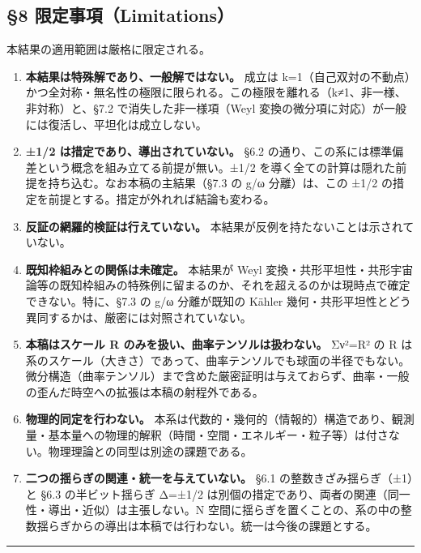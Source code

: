 \documentclass[11pt]{ltjsarticle}
\begin{document}
\subsection{§8
限定事項（Limitations）}\label{ux9650ux5b9aux4e8bux9805limitations}

本結果の適用範囲は厳格に限定される。

\begin{enumerate}
\def\labelenumi{\arabic{enumi}.}
\item
  \textbf{本結果は特殊解であり、一般解ではない。} 成立は
  k=1（自己双対の不動点）かつ全対称・無名性の極限に限られる。この極限を離れる（k≠1、非一様、非対称）と、§7.2
  で消失した非一様項（Weyl
  変換の微分項に対応）が一般には復活し、平坦化は成立しない。
\item
  \textbf{±1/2 は措定であり、導出されていない。} §6.2
  の通り、この系には標準偏差という概念を組み立てる前提が無い。±1/2
  を導く全ての計算は隠れた前提を持ち込む。なお本稿の主結果（§7.3 の g/ω
  分離）は、この ±1/2 の措定を前提とする。措定が外れれば結論も変わる。
\item
  \textbf{反証の網羅的検証は行えていない。}
  本結果が反例を持たないことは示されていない。
\item
  \textbf{既知枠組みとの関係は未確定。} 本結果が Weyl
  変換・共形平坦性・共形宇宙論等の既知枠組みの特殊例に留まるのか、それを超えるのかは現時点で確定できない。特に、§7.3
  の g/ω 分離が既知の Kähler
  幾何・共形平坦性とどう異同するかは、厳密には対照されていない。
\item
  \textbf{本稿はスケール R のみを扱い、曲率テンソルは扱わない。} Σν²=R²
  の R
  は系のスケール（大きさ）であって、曲率テンソルでも球面の半径でもない。微分構造（曲率テンソル）まで含めた厳密証明は与えておらず、曲率・一般の歪んだ時空への拡張は本稿の射程外である。
\item
  \textbf{物理的同定を行わない。}
  本系は代数的・幾何的（情報的）構造であり、観測量・基本量への物理的解釈（時間・空間・エネルギー・粒子等）は付さない。物理理論との同型は別途の課題である。
\item
  \textbf{二つの揺らぎの関連・統一を与えていない。} §6.1
  の整数きざみ揺らぎ（±1）と §6.3 の半ビット揺らぎ Δ=±1/2
  は別個の措定であり、両者の関連（同一性・導出・近似）は主張しない。N
  空間に揺らぎを置くことの、系の中の整数揺らぎからの導出は本稿では行わない。統一は今後の課題とする。
\end{enumerate}

\begin{center}\rule{0.5\linewidth}{0.5pt}\end{center}
\end{document}
